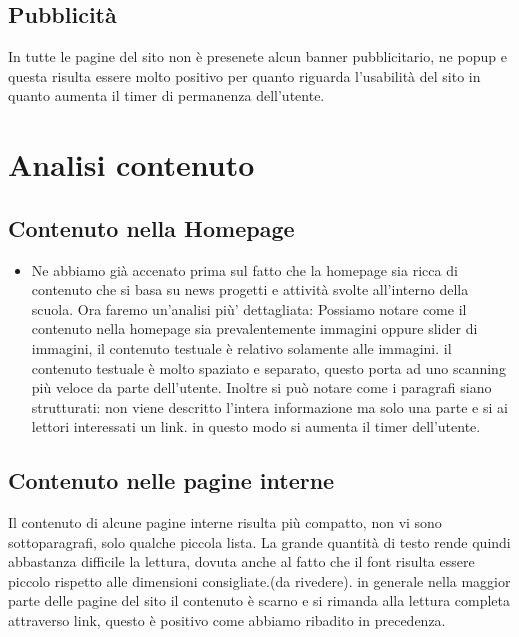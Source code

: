 \documentclass[12pt]{article}
\begin{document}
\subsection{Pubblicit\`a}
In tutte le pagine del sito non \`e presenete alcun banner pubblicitario, ne popup e questa risulta essere molto positivo per quanto riguarda l'usabilit\`a del sito in quanto aumenta il timer di permanenza dell'utente.

\newpage
\section{Analisi contenuto}
\subsection{Contenuto nella Homepage}
\begin{itemize}
	\item Ne abbiamo gi\`a accenato prima sul fatto che la homepage sia ricca di contenuto che si basa su news progetti e attivit\`a svolte all'interno della scuola. Ora faremo un'analisi pi\`u' dettagliata:
	Possiamo notare come il contenuto nella homepage sia prevalentemente immagini oppure slider di immagini, il contenuto testuale \`e relativo solamente alle immagini. il contenuto testuale \`e  molto spaziato e separato, questo porta ad uno scanning pi\`u  veloce da parte dell'utente. Inoltre si pu\`o  notare come i paragrafi siano strutturati:
	non viene descritto l'intera informazione ma solo una parte e si ai lettori interessati un link. in questo modo si aumenta il timer dell'utente.	 
\end{itemize}
\subsection{Contenuto nelle pagine interne}

	  Il contenuto di alcune pagine interne risulta pi\`u compatto, non vi sono sottoparagrafi, solo qualche piccola lista. La grande quantit\`a di testo rende quindi abbastanza difficile la lettura, dovuta anche al fatto che il font risulta essere piccolo rispetto alle dimensioni consigliate.(da rivedere).
	in generale nella maggior parte delle pagine del sito il contenuto \`e scarno e si rimanda alla lettura completa attraverso link, questo \`e positivo come abbiamo ribadito in precedenza.


\newpage
\end{document}
